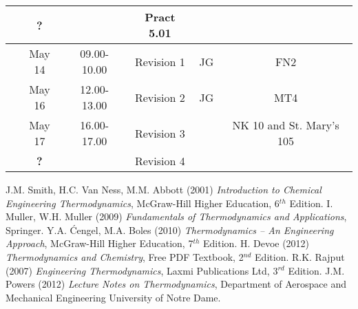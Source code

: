 \documentclass[11pt,oneside,a4paper]{article}
\begin{document}
\begin{center}
\begin{tabular}{||c||c|c|c|c|c||}
                                      &  {\bf ?} &             & Pract 5.01  &     &     \\
\hline
\multirow{6}{*}{\color{red}{Week 45}} & May 14   & 09.00-10.00 & Revision 1  & JG  & FN2 \\
                                      & May 16   & 12.00-13.00 & Revision 2  & JG  & MT4 \\
                                      & May 17   & 16.00-17.00 & Revision 3  &     & NK 10 and St. Mary's 105 \\
                                      &  {\bf ?} &             & Revision 4  &     &     \\
\hline

\hline\hline

\end{tabular}
\end{center}




\clearpage



\begin{thebibliography}{1}
%
 J.M. Smith, H.C. Van Ness, M.M. Abbott (2001) {\it Introduction to Chemical Engineering Thermodynamics}, McGraw-Hill Higher Education, 6$^{th}$ Edition.
%
 I. Muller, W.H. Muller (2009) {\it Fundamentals of Thermodynamics and Applications}, Springer.
%
 Y.A. \'Cengel, M.A. Boles (2010) {\it Thermodynamics -- An Engineering Approach}, McGraw-Hill Higher Education, 7$^{th}$ Edition.
%
 H. Devoe (2012) {\it Thermodynamics and Chemistry}, Free PDF Textbook, 2$^{nd}$ Edition.
%
 R.K. Rajput (2007) {\it Engineering Thermodynamics}, Laxmi Publications Ltd, 3$^{rd}$ Edition.
%
 J.M. Powers (2012) {\it Lecture Notes on Thermodynamics}, Department of Aerospace and Mechanical Engineering University of Notre Dame.
%
\end{thebibliography}
\end{document}
